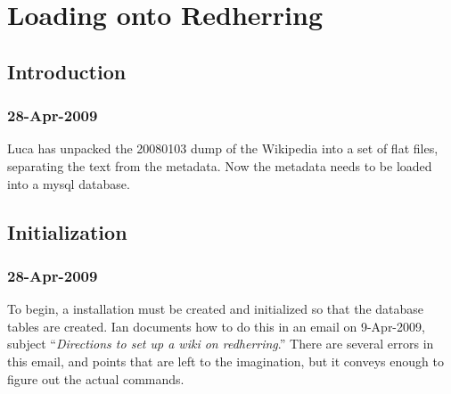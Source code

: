 \chapter{Loading onto Redherring}

\section{Introduction}

\subsection{28-Apr-2009}

Luca has unpacked the 20080103 dump of the Wikipedia into
a set of flat files, separating the text from the metadata.
Now the metadata needs to be loaded into a mysql database.

\section{Initialization}

\subsection{28-Apr-2009}

To begin, a \mediawiki installation must be created and
initialized so that the database tables are created.
Ian documents how to do this in an email on 9-Apr-2009,
subject ``\textit{Directions to set up a wiki on redherring}.''
There are several errors in this email, and points that are
left to the imagination, but it conveys enough to figure
out the actual commands.

